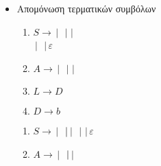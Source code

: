 \begin{tcolorbox}[colback=yellow!15!white, colframe=blue!50!white,
	fonttitle=\bfseries\Large, title = Μετατροπή $CFG\rightarrow CNF$ 1/3]
\begin{itemize}
\end{itemize}

\end{tcolorbox}


\begin{tcolorbox}[colback=yellow!15!white, colframe=blue!50!white,
	fonttitle=\bfseries\Large, title = Μετατροπή $CFG\rightarrow CNF$ 2/3]

	\begin{itemize}
		\itemsep0em

		\item Απομόνωση τερματικών συμβόλων
		\reducevspace\reducevspace\reducevspace\reducevspace\reducevspace\reducevspace\reducevspace\reducevspace

		\begin{minipage}[t]{0.5\textwidth}
			\begin{enumerate}
				\item $S\rightarrow$\textcolor{purple}{}$\,|\,$
				\textcolor{purple}{}$\,|\,$\textcolor{purple}{}$\,|$\\
									\textcolor{purple}{}$\,|\,$
									\textcolor{purple}{}$\,|\, \varepsilon$
				\reducevspace
				\item $A\rightarrow$\textcolor{purple}{}$\,|\,$
				\textcolor{purple}{}$\,|\,$\textcolor{purple}{}$\,|$\\
				\textcolor{purple}{}
				\reducevspace
				\item $L\rightarrow D$\textcolor{teal}{}
				\reducevspace
				\item $D\rightarrow b$
			\end{enumerate}
		\end{minipage}%
		\hfill
		\begin{minipage}[t]{0.5\textwidth}
			\begin{enumerate}
				\item $S\rightarrow$\textcolor{violet}{}$\,|\,$
				\textcolor{violet}{}$\,|\\$\textcolor{violet}{}$\,|\,$
				\textcolor{violet}{}$\,|\,$\textcolor{violet}{}$\,|\, \varepsilon$
				\reducevspace
				\item $A\rightarrow$\textcolor{violet}{}$\,|\,$
				\textcolor{violet}{}$\,|\\$\textcolor{violet}{}$\,|$

\end{enumerate}
\end{minipage}
\end{itemize}
\end{tcolorbox}
